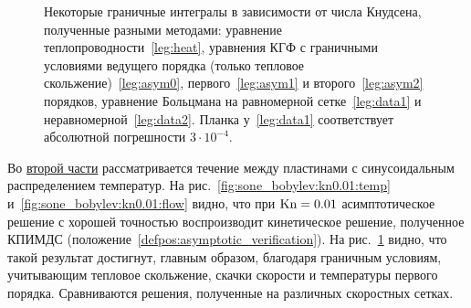 \begin{figure}
    \centering
    \hypersetup{hidelinks} %
    \caption{
        Некоторые граничные интегралы в зависимости от числа Кнудсена, полученные разными методами:
        уравнение теплопроводности~\ref{leg:heat},
        уравнения КГФ с граничными условиями ведущего порядка (только тепловое скольжение)~\ref{leg:asym0},
        первого~\ref{leg:asym1} и второго~\ref{leg:asym2} порядков,
        уравнение Больцмана на равномерной сетке~\ref{leg:data1} и неравномерной~\ref{leg:data2}.
        Планка у~\ref{leg:data1} соответствует абсолютной погрешности \(3\cdot10^{-4}\).
    }
    \label{fig:sone_bobylev:comparison}
\end{figure}

Во \underline{второй части} рассматривается течение между пластинами с синусоидальным распределением температур.
На рис.~\ref{fig:sone_bobylev:kn0.01:temp} и~\ref{fig:sone_bobylev:kn0.01:flow} видно,
что при \(\mathrm{Kn}=0.01\) асимптотическое решение с хорошей точностью воспроизводит кинетическое решение,
полученное КПИМДС (положение~\ref{defpos:asymptotic_verification}).
На рис.~\ref{fig:sone_bobylev:comparison} видно, что такой результат достигнут, главным образом,
благодаря граничным условиям, учитывающим тепловое скольжение, скачки скорости и температуры первого порядка.
Сравниваются решения, полученные на различных скоростных сетках.

